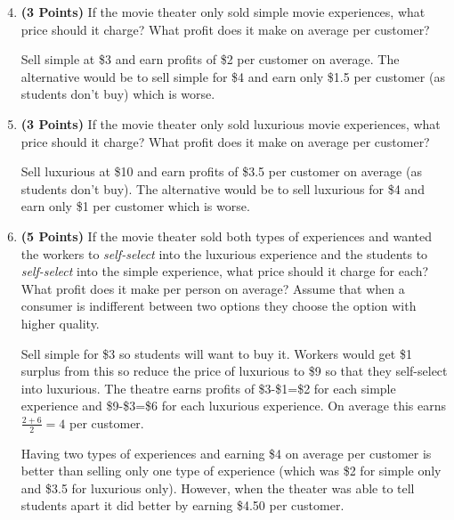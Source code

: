 \documentclass[11pt]{article}
\newcounter{question}[section]
\newenvironment{subquestions}{
  \begin{enumerate}[label=(\roman*)]}{\end{enumerate}}
\begin{document}
\begin{subquestions}
  \setcounter{enumi}{3}
\item \textbf{(3 Points)} If the movie theater only sold simple movie experiences, what price should it charge? What profit does it make on average per customer?

    \textcolor{solution-color}{
      Sell simple at \$3 and earn profits of \$2 per customer on average. The alternative would be to sell simple for \$4 and earn only \$1.5 per customer (as students don't buy) which is worse.
    }
\item \textbf{(3 Points)} If the movie theater only sold luxurious movie experiences, what price should it charge? What profit does it make on average per customer?

    \textcolor{solution-color}{
      Sell luxurious at \$10 and earn profits of \$3.5 per customer on average (as students don't buy). The alternative would be to sell luxurious for \$4 and earn only \$1 per customer which is worse.
    }
\item \textbf{(5 Points)} If the movie theater sold both types of experiences and wanted the workers to \emph{self-select} into the luxurious experience and the students to \emph{self-select} into the simple experience, what price should it charge for each? What profit does it make per person on average? Assume that when a consumer is indifferent between two options they choose the option with higher quality.

  \textcolor{solution-color}{
  Sell simple for \$3 so students will want to buy it. Workers would get \$1 surplus from this so reduce the price of luxurious to \$9 so that they self-select into luxurious. The theatre earns profits of \$3-\$1=\$2 for each simple experience and \$9-\$3=\$6 for each luxurious experience. On average this earns $\frac{2+6}{2}=4$ per customer.}

  \textcolor{solution-color}{
    Having two types of experiences and earning \$4 on average per customer is better than selling only one type of experience (which was \$2 for simple only and \$3.5 for luxurious only). However, when the theater was able to tell students apart it did better by earning \$4.50 per customer.
  }
\end{subquestions}
\end{document}
